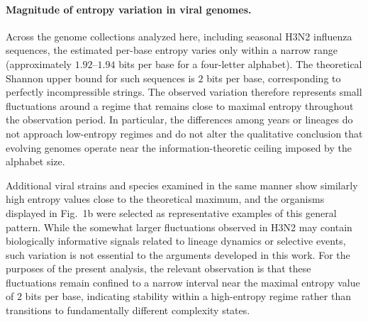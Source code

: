 {\color{red}

\paragraph{Magnitude of entropy variation in viral genomes.}
Across the  genome collections analyzed here, including seasonal H3N2 influenza sequences, the estimated per-base entropy varies only within a narrow range (approximately $1.92$--$1.94$ bits per base for a four-letter alphabet). The theoretical Shannon upper bound for such sequences is $2$ bits per base, corresponding to perfectly incompressible strings. The observed variation therefore represents small fluctuations around a regime that remains close to maximal entropy throughout the observation period. In particular, the differences among years or lineages do not approach low-entropy regimes and do not alter the qualitative conclusion that evolving genomes operate near the information-theoretic ceiling imposed by the alphabet size.

Additional viral strains and species examined in the same manner show similarly high entropy values close to the theoretical maximum, and the organisms displayed in Fig.~1b were selected as representative examples of this general pattern. While the somewhat larger fluctuations observed in H3N2 may contain biologically informative signals related to lineage dynamics or selective events, such variation is not essential to the arguments developed in this work. For the purposes of the present analysis, the relevant observation is that these fluctuations remain confined to a narrow interval near the maximal entropy value of $2$ bits per base, indicating stability within a high-entropy regime rather than transitions to fundamentally different complexity states.



}
